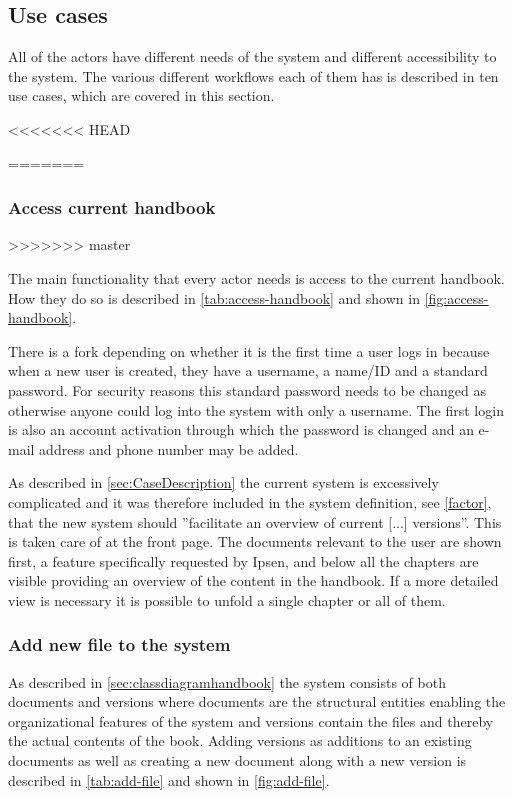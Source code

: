 \subsection{Use cases} \label{sec:usecases}
All of the actors have different needs of the system and different accessibility to the system. The various different workflows each of them has is described in ten use cases, which are covered in this section.

<<<<<<< HEAD


=======
\subsubsection{Access current handbook}
>>>>>>> master

The main functionality that every actor needs is access to the current handbook. How they do so is described in \cref{tab:access-handbook} and shown in \cref{fig:access-handbook}.




There is a fork depending on whether it is the first time a user logs in because when a new user is created, they have a username, a name/ID and a standard password.
For security reasons this standard password needs to be changed as otherwise anyone could log into the system with only a username.
The first login is also an account activation through which the password is changed and an e-mail address and phone number may be added.

As described in \cref{sec:CaseDescription} the current system is excessively complicated and it was therefore included in the system definition, see \cref{factor}, that the new system should ''facilitate an overview of current [...] versions''.
This is taken care of at the front page.
The documents relevant to the user are shown first, a feature specifically requested by Ipsen, and below all the chapters are visible providing an overview of the content in the handbook.
If a more detailed view is necessary it is possible to unfold a single chapter or all of them.


\subsubsection{Add new file to the system}
As described in \cref{sec:classdiagramhandbook} the system consists of both documents and versions where documents are the structural entities enabling the organizational features of the system and versions contain the files and thereby the actual contents of the book.
Adding versions as additions to an existing documents as well as creating a new document along with a new version is described in \cref{tab:add-file} and shown in \cref{fig:add-file}.

